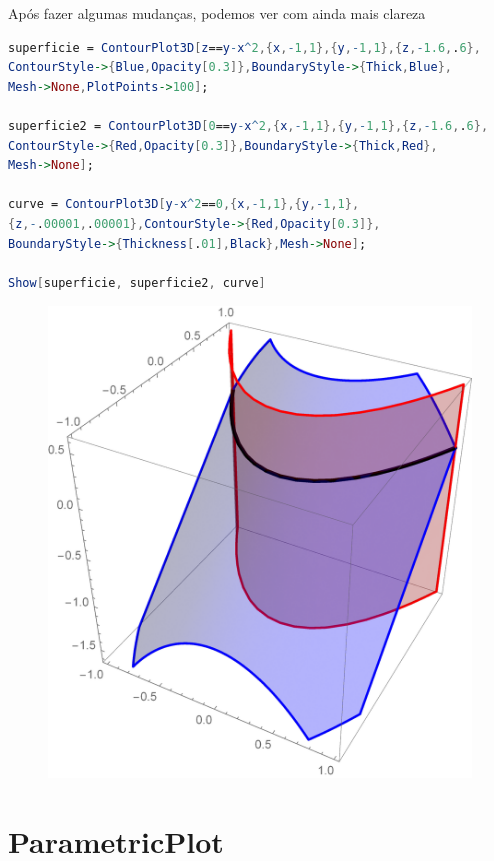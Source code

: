 \documentclass[a4paper, 12pt]{article}
\begin{document}
Após fazer algumas mudanças, podemos ver com ainda mais clareza

\begin{lstlisting}[language=Mathematica]
superficie = ContourPlot3D[z==y-x^2,{x,-1,1},{y,-1,1},{z,-1.6,.6}, 
ContourStyle->{Blue,Opacity[0.3]},BoundaryStyle->{Thick,Blue},
Mesh->None,PlotPoints->100];

superficie2 = ContourPlot3D[0==y-x^2,{x,-1,1},{y,-1,1},{z,-1.6,.6}, 
ContourStyle->{Red,Opacity[0.3]},BoundaryStyle->{Thick,Red},
Mesh->None];

curve = ContourPlot3D[y-x^2==0,{x,-1,1},{y,-1,1},
{z,-.00001,.00001},ContourStyle->{Red,Opacity[0.3]},
BoundaryStyle->{Thickness[.01],Black},Mesh->None];

Show[superficie, superficie2, curve]
\end{lstlisting}

\newpage
\begin{figure}[!h]
	\centering
	\includegraphics[scale=.5]{images/Together}
\end{figure}

\section{ParametricPlot}
\end{document}
